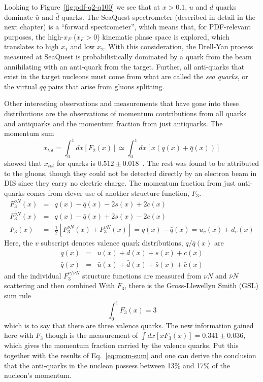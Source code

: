 Looking to Figure~\ref{fig:pdf-q2-q100} we see that at $x>0.1$, $u$ and $d$ quarks dominate $\bar{u}$ and $\bar{d}$ quarks. The SeaQuest spectrometer (described in detail in the next chapter) is a ``forward spectrometer'', which means that, for PDF-relevant purposes, the high-$x_F$ ($x_F>0$) kinematic phase space is explored, which translates to high $x_1$ and low $x_2$. With this consideration, the Drell-Yan process measured at SeaQuest is probabilistically dominated by a quark from the beam annihilating with an anti-quark from the target. Further, all anti-quarks that exist in the target nucleons must come from what are called the \emph{sea quarks}, or the virtual $q\bar{q}$ pairs 
that arise from gluons splitting. 

Other interesting observations and measurements that have gone into these distributions are the observations of momentum contributions from all quarks and antiquarks and the momentum fraction from just antiquarks. The momentum sum
\begin{equation}
x_{tot} = \int_0^1 dx [F_2(x)] \simeq \int_0^1 dx [x(q(x) + \bar{q}(x))] \label{eq:mom-sum}
\end{equation}
showed that $x_{tot}$ for quarks is $0.512 \pm 0.018$~\cite{griffiths2008introduction}. The rest was found to be attributed to the gluons, though they could not be detected directly by an electron beam in DIS since they carry no electric charge. The momentum fraction from just anti-quarks comes from clever use of another structure function, $F_3$.
\begin{eqnarray}
F_3^{\nu N}(x) & = & q(x) - \bar{q}(x) - 2s(x) + 2c(x) \\
F_3^{\bar{\nu} N}(x) & = & q(x) - \bar{q}(x) + 2s(x) - 2c(x) \\
F_3(x) & = & \frac{1}{2} [F_3^{\nu N}(x) + F_3^{\bar{\nu} N}(x)] = q(x) - \bar{q}(x) = u_v(x) + d_v(x)
\end{eqnarray}
Here, the $v$ subscript denotes valence quark distributions, $q/\bar{q}(x)$ are
\begin{eqnarray}
q(x) & = & u(x) + d(x) + s(x) + c(x) \\
\bar{q}(x) & = & \bar{u}(x) + \bar{d}(x) + \bar{s}(x) + \bar{c}(x)
\end{eqnarray}
and the individual $F_3^{\nu/\bar{\nu}N}$ structure functions are measured from $\nu N$ and $\bar{\nu} N$ scattering and then combined With $F_3$, there is the Gross-Llewellyn Smith (GSL) sum rule\cite{Gross:1969jf}
\begin{equation}
\int_0^1 F_3(x) = 3
\end{equation}
which is to say that there are three valence quarks. The new information gained here with $F_3$ though is the measurement of $\int dx [xF_3(x)] = 0.341 \pm 0.036$, which gives the momentum fraction carried by the valence quarks. Put this together with the results of Eq.~\ref{eq:mom-sum} and one can derive the conclusion that the anti-quarks in the nucleon possess between 13\% and 17\% of the nucleon's momentum\cite{Fisk:1982pn}.

